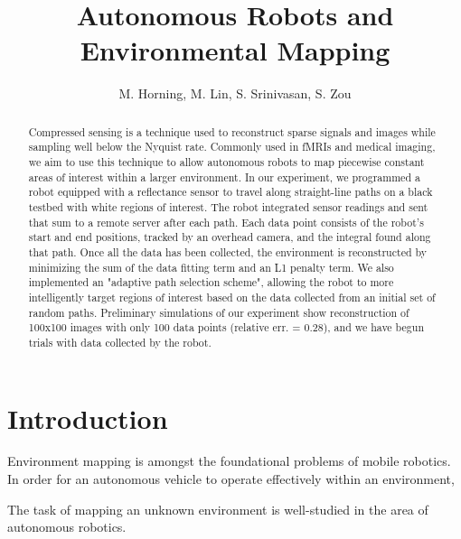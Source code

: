 \documentclass[english]{article}\usepackage[]{graphicx}\usepackage[]{color}
\begin{document}
\title{Autonomous Robots and Environmental Mapping}

\author{M. Horning, M. Lin, S. Srinivasan, S. Zou}

\maketitle

\begin{abstract}

Compressed sensing is a technique used to reconstruct sparse signals and images while sampling well below the Nyquist rate. Commonly used in fMRIs and medical imaging, we aim to use this technique to allow autonomous robots to map piecewise constant areas of interest within a larger environment. In our experiment, we programmed a robot equipped with a reflectance sensor to travel along straight-line paths on a black testbed with white regions of interest. The robot integrated sensor readings and sent that sum to a remote server after each path. Each data point consists of the robot's start and end positions, tracked by an overhead camera, and the integral found along that path. Once all the data has been collected, the environment is reconstructed by minimizing the sum of the data fitting term and an L1 penalty term. We also implemented an "adaptive path selection scheme", allowing the robot to more intelligently target regions of interest based on the data collected from an initial set of random paths. Preliminary simulations of our experiment show reconstruction of 100x100 images with only 100 data points (relative err. = 0.28), and we have begun trials with data collected by the robot.

\end{abstract}

\pagebreak
\tableofcontents
\pagebreak

\section{Introduction}

Environment mapping is amongst the foundational problems of mobile robotics. In order for an autonomous vehicle to operate effectively within an environment, 

The task of mapping an unknown environment is well-studied in the area of autonomous robotics. 
\end{document}
